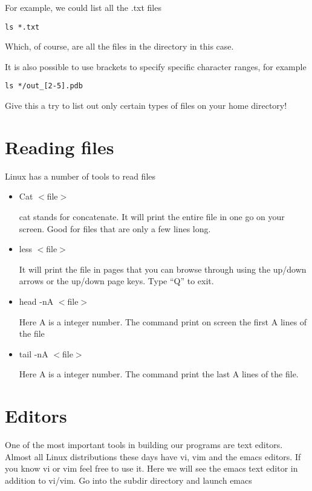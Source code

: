 \documentclass[aps,showpacs,prd,notitlepage,preprintnumbers,amsmath,amssymb,letterpaper]{revtex4}
\begin{document}
For example, we could list all the .txt files
\begin{verbatim}
ls *.txt
\end{verbatim}
Which, of course, are all the files in the directory in this case.

It is also possible to use brackets to specify specific character ranges, for example
\begin{verbatim}
ls */out_[2-5].pdb
\end{verbatim}

Give this a try to list out only certain types of files on your home directory!

\section{Reading files}

Linux has a number of tools to read files

\begin{itemize}

\item Cat $<$file$>$

  cat stands for concatenate. It will print the entire file in one go on your screen. Good for files
  that are only a few lines long.

\item less $<$file$>$

  It will print the file in pages that you can browse through using the up/down arrows or the up/down
  page keys. Type ``Q'' to exit.

\item head -nA $<$file$>$

  Here A is a integer number. The command print on screen the first A lines of the file

\item tail -nA $<$file$>$

Here A is a integer number. The command print the last A lines of the file.

\end{itemize}

\section{Editors}

One of the most important tools in building our programs are text
editors.  Almost all Linux distributions these days have vi, vim and
the emacs editors.  If you know vi or vim feel free to use it. Here we
will see the emacs text editor in addition to vi/vim. Go into the subdir directory and
launch emacs
\end{document}
